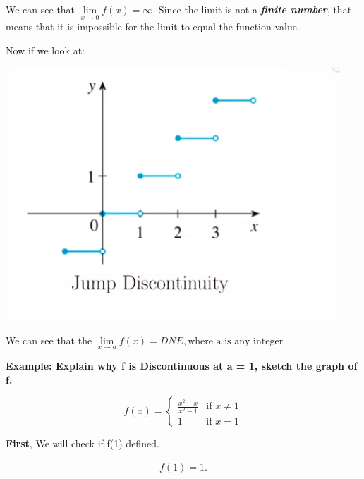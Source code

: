 \documentclass{report}
\begin{document}
        \bigbreak \noindent 
        We can see that $\lim\limits_{x \to 0}{f \left(x\right) = \infty}$, Since the limit 
        is not a \textbf{\textit{finite number}}, that means that it is impossible for the 
        limit to equal the function value.

        \bigbreak \noindent \bigbreak \noindent 
        Now if we look at:

        \bigbreak \noindent 
        \begin{center}
            \includegraphics[scale=0.6]{../images/4.png}
        \end{center}

        \bigbreak \noindent
        We can see that the $\lim\limits_{x \to a}{f \left(x\right) = DNE, \text{where a is any integer}}$

        \pagebreak
        \noindent \textbf{Example: Explain why f is Discontinuous at a = 1, sketch the graph of f.}

        \bigbreak \noindent \bigbreak \noindent 
           \begin{equation}
            f \left(x\right)=
                \begin{cases}
                    \frac{x^2-x}{x^2-1} & \text{if } x \neq 1 \\
                    1 & \text{if } x = 1 
                \end{cases}
            \end{equation}

        \bigbreak \noindent 
        \textbf{First}, We will check if f(1) defined.

        \begin{align*}
            f \left(1\right) = 1
        .\end{align*}
\end{document}
